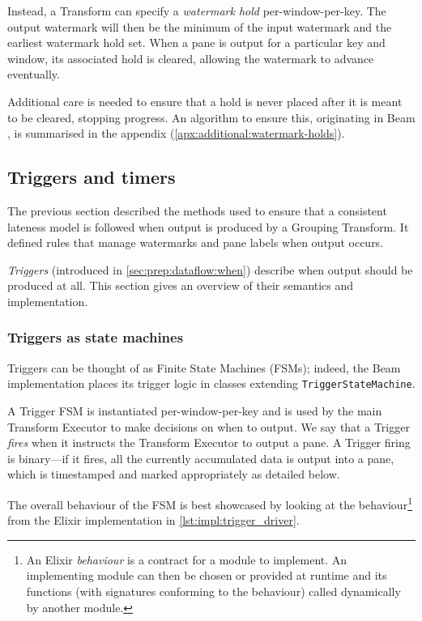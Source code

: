Instead, a Transform can specify a \emph{watermark hold} per-window-per-key.
The output watermark will then be the minimum of the input watermark and the earliest watermark hold set.
When a pane is output for a particular key and window, its associated hold is cleared, allowing the watermark to advance eventually.

Additional care is needed to ensure that a hold is never placed after it is meant to be cleared, stopping progress.
An algorithm to ensure this, originating in Beam \cite{BEAM-code-WatermarkManager}, is summarised in the appendix (\cref{apx:additional:watermark-holds}).

\subsection{Triggers and timers}\label{sec:impl:dataflow:triggers-timers}

The previous section described the methods used to ensure that a consistent lateness model is followed when output is produced by a Grouping Transform.
It defined rules that manage watermarks and pane labels when output occurs.

\emph{Triggers} (introduced in \cref{sec:prep:dataflow:when}) describe when output should be produced at all.
This section gives an overview of their semantics and implementation.

\subsubsection{Triggers as state machines}
Triggers can be thought of as Finite State Machines (FSMs); indeed, the Beam implementation places its trigger logic in classes extending \verb|TriggerStateMachine|.

A Trigger FSM is instantiated per-window-per-key and is used by the main Transform Executor to make decisions on when to output.
We say that a Trigger \emph{fires} when it instructs the Transform Executor to output a pane.
A Trigger firing is binary---if it fires, all the currently accumulated data is output into a pane, which is timestamped and marked appropriately as detailed below.

The overall behaviour of the FSM is best showcased by looking at the  behaviour\footnote{An Elixir \emph{behaviour} is a contract for a module to implement. An implementing module can then be chosen or provided at runtime and its functions (with signatures conforming to the behaviour) called dynamically by another module.} from the Elixir implementation in \cref{lst:impl:trigger_driver}.

